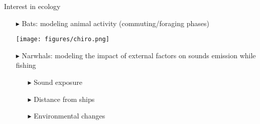 \documentclass[french,english]{beamer}
\begin{document}
\begin{frame}{Interest in ecology}
     \begin{itemize}
        
              \item[$\blacktriangleright$] Bats: modeling animal activity (commuting/foraging phases)
              \begin{center}

             
             \begin{center}
            \texttt{[image: figures/chiro.png]} 
             \end{center}       
             
                 
              \end{center}
              \item[$\blacktriangleright$] Narwhals: modeling the impact of external factors on sounds emission while fishing
              \begin{itemize}
                 \item[$\blacktriangleright$]  Sound exposure
                 \item[$\blacktriangleright$]   Distance from ships
                     \item[$\blacktriangleright$]  Environmental changes
              \end{itemize}
              
         
        \end{itemize} 

    


  
\end{frame}
\end{document}
